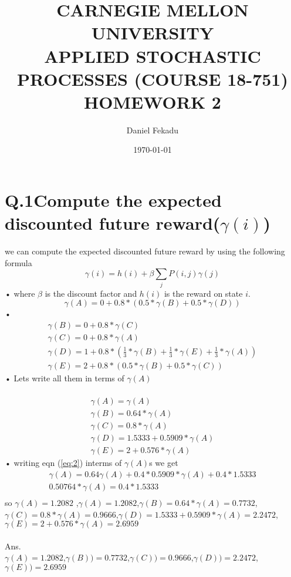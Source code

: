 \documentclass[a4paper,11pt]{article}
\begin{document}
\title{\color{red}CARNEGIE MELLON UNIVERSITY\\
APPLIED STOCHASTIC PROCESSES  (COURSE 18-751)\\
HOMEWORK 2}
\author{Daniel Fekadu}
\date{\today}
\maketitle
\clearpage
\newpage
\section*{Q.1\quad Compute the expected discounted future reward($\gamma (i)$)}

we can compute the expected discounted future reward by using the following formula
\begin{equation}
\gamma(i) = h(i) + \beta \sum_{j}P(i,j)\gamma(j)
\end{equation}•
where $\beta$ is the discount factor and $h(i)$ is the reward on state $i$.
\begin{equation}\label{eq:2}
\gamma(A) = 0 +  0.8*(0.5*\gamma(B)+0.5*\gamma(D))
\end{equation}•
\begin{eqnarray}
\gamma(B) = 0 +  0.8*\gamma(C)\\
\gamma(C) = 0 +  0.8*\gamma(A)\\
\gamma(D) = 1 +  0.8*(\frac{1}{3}*\gamma(B)+\frac{1}{3}*\gamma(E)+\frac{1}{3}*\gamma(A))\\
\gamma(E) = 2 +  0.8*(0.5*\gamma(B)+0.5*\gamma(C))
\end{eqnarray}•
Lets write all them in terms of  $\gamma(A)$\\\\
\begin{eqnarray}
\gamma(A) = \gamma(A)\\
\gamma(B) = 0.64*\gamma(A)\\
\gamma(C) = 0.8*\gamma(A)\\
\gamma(D) = 1.5333+0.5909*\gamma(A)\\
\gamma(E) = 2+0.576*\gamma(A)
\end{eqnarray}•
writing eqn (\ref{eq:2}) interms of $\gamma(A)$s we get \\
\begin{eqnarray}
\gamma(A) = 0.64\gamma(A) + 0.4*0.5909*\gamma(A) + 0.4*1.5333\\
0.50764*\gamma(A) = 0.4*1.5333\\
\end{eqnarray}
so $\gamma(A)=1.2082$ ,$\gamma(A)=1.2082$,\quad $\gamma(B)=0.64*\gamma(A)=0.7732$,\\ \quad$\gamma(C)=0.8*\gamma(A)=0.9666$,\quad$\gamma(D)=1.5333+0.5909*\gamma(A)=2.2472$,\quad$\gamma(E)=2+0.576*\gamma(A)=2.6959$\\\\
Ans.\\
$\gamma(A)=1.2082$,\quad $\gamma(B))=0.7732$,\quad $\gamma(C))=0.9666$,\quad $\gamma(D))=2.2472$,\quad $\gamma(E))=2.6959$
\newpage
\end{document}
